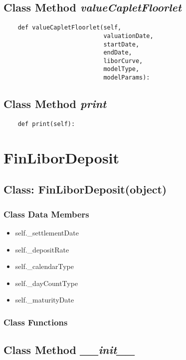 \documentclass[twoside,11pt]{book}
\begin{document}
\subsection{Class Method {\it valueCapletFloorlet}}


\begin{lstlisting}
    def valueCapletFloorlet(self,
                            valuationDate,
                            startDate, 
                            endDate, 
                            liborCurve, 
                            modelType, 
                            modelParams):
\end{lstlisting}

\subsection{Class Method {\it print}}


\begin{lstlisting}
    def print(self):
\end{lstlisting}

\newpage
\section{FinLiborDeposit}

\subsection{Class: FinLiborDeposit(object)}


\subsubsection{Class Data Members}
\begin{itemize}
\item{self.\_settlementDate}
\item{self.\_depositRate}
\item{self.\_calendarType}
\item{self.\_dayCountType}
\item{self.\_maturityDate}
\end{itemize}

\subsubsection{Class Functions}

\subsection{Class Method {\it \_\_init\_\_}}
\end{document}
